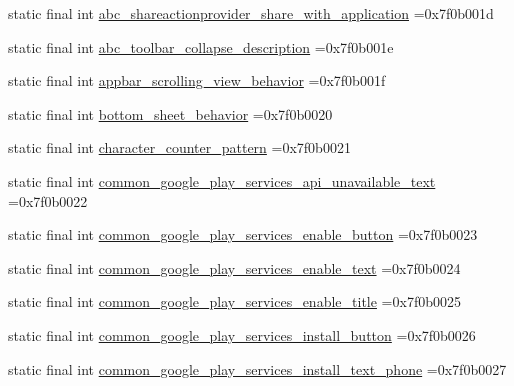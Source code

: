 \begin{DoxyCompactItemize}
\item 
static final int \mbox{\hyperlink{classbr_1_1unb_1_1cic_1_1mp_1_1marketmaster_1_1test_1_1R_1_1string_a40fac5de80a8d25dbebf98ce9822f037}{abc\+\_\+shareactionprovider\+\_\+share\+\_\+with\+\_\+application}} =0x7f0b001d
\item 
static final int \mbox{\hyperlink{classbr_1_1unb_1_1cic_1_1mp_1_1marketmaster_1_1test_1_1R_1_1string_a9c15ce19bc028018be21c8460aeefd07}{abc\+\_\+toolbar\+\_\+collapse\+\_\+description}} =0x7f0b001e
\item 
static final int \mbox{\hyperlink{classbr_1_1unb_1_1cic_1_1mp_1_1marketmaster_1_1test_1_1R_1_1string_a7f324f2556212730741bc46fb89c9a51}{appbar\+\_\+scrolling\+\_\+view\+\_\+behavior}} =0x7f0b001f
\item 
static final int \mbox{\hyperlink{classbr_1_1unb_1_1cic_1_1mp_1_1marketmaster_1_1test_1_1R_1_1string_addf1bce7c64b621bcfd5ef1ada5d2c8e}{bottom\+\_\+sheet\+\_\+behavior}} =0x7f0b0020
\item 
static final int \mbox{\hyperlink{classbr_1_1unb_1_1cic_1_1mp_1_1marketmaster_1_1test_1_1R_1_1string_a63cdf886c0b69d10c4f153be10a76236}{character\+\_\+counter\+\_\+pattern}} =0x7f0b0021
\item 
static final int \mbox{\hyperlink{classbr_1_1unb_1_1cic_1_1mp_1_1marketmaster_1_1test_1_1R_1_1string_a39718fabb39ff8611e5c12d8f872eb94}{common\+\_\+google\+\_\+play\+\_\+services\+\_\+api\+\_\+unavailable\+\_\+text}} =0x7f0b0022
\item 
static final int \mbox{\hyperlink{classbr_1_1unb_1_1cic_1_1mp_1_1marketmaster_1_1test_1_1R_1_1string_ad818fdf6942b625956f713c5d1068c53}{common\+\_\+google\+\_\+play\+\_\+services\+\_\+enable\+\_\+button}} =0x7f0b0023
\item 
static final int \mbox{\hyperlink{classbr_1_1unb_1_1cic_1_1mp_1_1marketmaster_1_1test_1_1R_1_1string_a65687f90d4ba3e0392565b07a7a2ee09}{common\+\_\+google\+\_\+play\+\_\+services\+\_\+enable\+\_\+text}} =0x7f0b0024
\item 
static final int \mbox{\hyperlink{classbr_1_1unb_1_1cic_1_1mp_1_1marketmaster_1_1test_1_1R_1_1string_af08b8333362fb072038368efd8a9e28a}{common\+\_\+google\+\_\+play\+\_\+services\+\_\+enable\+\_\+title}} =0x7f0b0025
\item 
static final int \mbox{\hyperlink{classbr_1_1unb_1_1cic_1_1mp_1_1marketmaster_1_1test_1_1R_1_1string_adc92542f21f82f5968eab0c6b4dca39b}{common\+\_\+google\+\_\+play\+\_\+services\+\_\+install\+\_\+button}} =0x7f0b0026
\item 
static final int \mbox{\hyperlink{classbr_1_1unb_1_1cic_1_1mp_1_1marketmaster_1_1test_1_1R_1_1string_a3d3cbb70af9011d8527da39124669bd9}{common\+\_\+google\+\_\+play\+\_\+services\+\_\+install\+\_\+text\+\_\+phone}} =0x7f0b0027

\end{DoxyCompactItemize}
